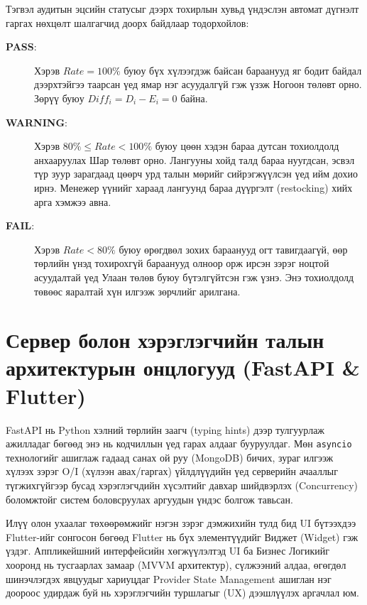 Тэгвэл аудитын эцсийн статусыг дээрх тохирлын хувьд үндэслэн автомат дүгнэлт гаргах нөхцөлт шалгагчид доорх байдлаар тодорхойлов:
\begin{description}
    \item[\textbf{PASS}:] Хэрэв $Rate = 100\%$ буюу бүх хүлээгдэж байсан бараанууд яг бодит байдал дээрхтэйгээ таарсан үед ямар нэг асуудалгүй гэж үзэж Ногоон төлөвт орно. Зөрүү буюу $Diff_i = D_i - E_i = 0$ байна.
    \item[\textbf{WARNING}:] Хэрэв $80\% \le Rate < 100\%$ буюу цөөн хэдэн бараа дутсан тохиолдолд анхааруулах Шар төлөвт орно. Лангууны хойд талд бараа нуугдсан, эсвэл түр зуур зарагдаад цөөрч урд талын мөрийг сийрэгжүүлсэн үед ийм дохио ирнэ. Менежер үүнийг хараад лангуунд бараа дүүргэлт (restocking) хийх арга хэмжээ авна.
    \item[\textbf{FAIL}:] Хэрэв $Rate < 80\%$ буюу өрөгдвөл зохих бараанууд огт тавигдаагүй, өөр төрлийн үнэд тохирохгүй бараанууд олноор орж ирсэн зэрэг ноцтой асуудалтай үед Улаан төлөв буюу бүтэлгүйтсэн гэж үзнэ. Энэ тохиолдолд төвөөс яаралтай хүн илгээж зөрчлийг арилгана.
\end{description}

\section{Сервер болон хэрэглэгчийн талын архитектурын онцлогууд (FastAPI \& Flutter)}
FastAPI нь Python хэлний төрлийн заагч (typing hints) дээр тулгуурлаж ажилладаг бөгөөд энэ нь кодчиллын үед гарах алдааг бууруулдаг. Мөн \texttt{asyncio} технологийг ашиглаж гадаад санах ой руу (MongoDB) бичих, зураг илгээж хүлээх зэрэг O/I (хүлээн авах/гаргах) үйлдлүүдийн үед серверийн ачааллыг түгжихгүйгээр бусад хэрэглэгчдийн хүсэлтийг давхар шийдвэрлэх (Concurrency) боломжтойг систем боловсруулах аргуудын үндэс болгож тавьсан.

Илүү олон ухаалаг төхөөрөмжийг нэгэн зэрэг дэмжихийн тулд бид UI бүтээхдээ Flutter-ийг сонгосон бөгөөд Flutter нь бүх элементүүдийг Виджет (Widget) гэж үздэг. Аппликейшний интерфейсийн хөгжүүлэлтэд UI ба Бизнес Логикийг хооронд нь тусгаарлах замаар (MVVM архитектур), сүлжээний алдаа, өгөгдөл шинэчлэгдэх явцуудыг хариуцдаг Provider State Management ашиглан нэг доороос удирдаж буй нь хэрэглэгчийн туршлагыг (UX) дээшлүүлэх аргачлал юм.
